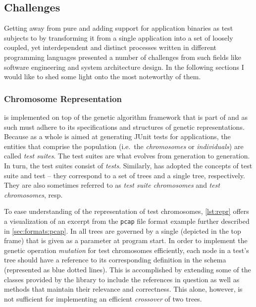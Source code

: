 \subsection{Challenges}
Getting away from pure \java and adding support for application binaries as test subjects 
to \xmlmate by transforming it from 
a single \java application into a set of loosely coupled, yet interdependent and distinct 
processes written in different programming languages presented a number of challenges from 
such fields like software engineering and system architecture design. 
In the following sections I would like to shed some light onto 
the most noteworthy of them.
\subsubsection{Chromosome Representation}
\label{sec:repr}
\xmlmate is implemented on top of the genetic algorithm framework that is part of 
\evosuite{}\cite{fraser2013whole} and as such must adhere to its specifications and structures 
of genetic representations. 
Because \evosuite as a whole is aimed at generating {\small JUnit} tests for \java applications, 
the entities that comprise the population  (i.e.\ the \emph{chromosomes} or \emph{individuals}) 
are called \emph{test suites}. The test suites are what evolves from generation to generation.
In turn, the test suites consist of \emph{tests}. Similarly, \xmlmate has adopted the concepts of 
test suite and test -- they correspond to a set of \xml trees and a single \xml tree, respectively. 
They are also sometimes referred to as \emph{test suite chromosomes} and \emph{test chromosomes}, resp.

To ease understanding of the representation of \xml test chromosomes, \cref{lst:repr} offers a
visualization of an excerpt from the \texttt{pcap} file format example further described in
\cref{sec:formats:pcap}. In \xmlmate all \xml trees are governed by a single \xsd (depicted in the top frame)
that is given as a parameter at program start. In order to implement the genetic operation \emph{mutation} for
test chromosomes efficiently, each node in a test's \xml tree should have a reference to its
corresponding definition in the schema (represented as blue dotted lines). This is accomplished by extending
some of the \java classes provided by the \xom library to include the references in question as well as methods
that maintain their relevance and correctness. This alone, however, is not sufficient for implementing an
efficient \emph{crossover} of two \xml trees.

